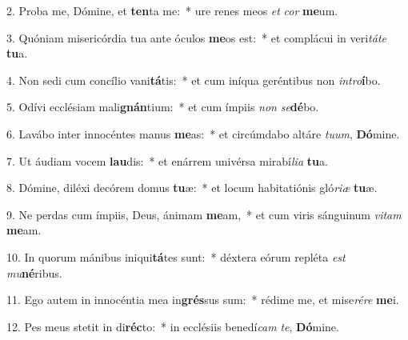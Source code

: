 2. Proba me, Dómine, et \textbf{ten}ta me:~*  ure renes meos \textit{et} \textit{cor} \textbf{me}um.\

3. Quóniam misericórdia tua ante óculos \textbf{me}os est:~*  et complácui in veri\textit{tá}\textit{te} \textbf{tu}a.\

4. Non sedi cum concílio vani\textbf{tá}tis:~*  et cum iníqua geréntibus non \textit{in}\textit{tro}\textbf{í}bo.\

5. Odívi ecclésiam mali\textbf{gnán}tium:~*  et cum ímpiis \textit{non} \textit{se}\textbf{dé}bo.\

6. Lavábo inter innocéntes manus \textbf{me}as:~*  et circúmdabo altáre \textit{tu}\textit{um}, \textbf{Dó}mine.\

7. Ut áudiam vocem \textbf{lau}dis:~*  et enárrem univérsa mirabí\textit{li}\textit{a} \textbf{tu}a.\

8. Dómine, diléxi decórem domus \textbf{tu}æ:~*  et locum habitatiónis gló\textit{ri}\textit{æ} \textbf{tu}æ.\

9. Ne perdas cum ímpiis, Deus, ánimam \textbf{me}am,~*  et cum viris sánguinum \textit{vi}\textit{tam} \textbf{me}am.\

10. In quorum mánibus iniqui\textbf{tá}tes sunt:~*  déxtera eórum repléta \textit{est} \textit{mu}\textbf{né}ribus.\

11. Ego autem in innocéntia mea in\textbf{grés}sus sum:~*  rédime me, et mise\textit{ré}\textit{re} \textbf{me}i.\

12. Pes meus stetit in di\textbf{réc}to:~*  in ecclésiis benedí\textit{cam} \textit{te}, \textbf{Dó}mine.\

